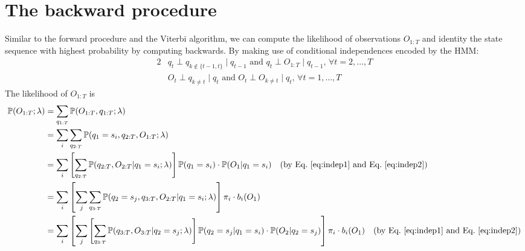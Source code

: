 \section{The backward procedure}
\label{sec:backward}

Similar to the forward procedure and the Viterbi algorithm, 
we can compute the likelihood of observations $O_{1:T}$ and identity the state sequence with highest probability by computing backwards.
By making use of conditional independences encoded by the HMM:
\begin{alignat}{2}
& q_t \perp q_{k \notin \{t-1,t\}} \mid q_{t-1} \text{~and~} q_t \perp O_{1:T} \mid q_{t-1}, \, \forall t=2,\dots,T  \label{eq:indep1} \\
& O_t \perp q_{k \ne t} \mid q_t \text{~and~} O_t \perp O_{k \ne t} \mid q_t, \, \forall t=1,\dots,T                \label{eq:indep2}
\end{alignat}
The likelihood of $O_{1:T}$ is 
\begin{align*}
\mathbb{P}(O_{1:T} ;\lambda) 
&= \sum_{q_{1:T}} \mathbb{P}(O_{1:T},q_{1:T} ;\lambda) \\
&= \sum_{i} \sum_{q_{2:T}} \mathbb{P}(q_1 = s_i, q_{2:T}, O_{1:T} ;\lambda) \\
&= \sum_{i} \left[ \sum_{q_{2:T}} \mathbb{P}(q_{2:T}, O_{2:T} |q_1 = s_i; \lambda) \right] \mathbb{P}(q_1 = s_i) \cdot \mathbb{P}(O_1 |q_1 = s_i) 
   ~~~ \text{(by Eq.~\ref{eq:indep1} and Eq.~\ref{eq:indep2})} \\
&= \sum_{i} \left[ \sum_{j} \sum_{q_{3:T}} \mathbb{P}(q_2 = s_j, q_{3:T}, O_{2:T} |q_1 = s_i; \lambda) \right] \pi_i \cdot b_i(O_1) \\
&= \sum_{i} \left[ \sum_{j} \left[ \sum_{q_{3:T}} \mathbb{P}(q_{3:T}, O_{3:T} |q_2 = s_j; \lambda) \right] \mathbb{P}(q_2 = s_j |q_1 = s_i) \cdot \mathbb{P}(O_2 |q_2 = s_j) 
   \right] \pi_i \cdot b_i(O_1) 
   ~~~ \text{(by Eq.~\ref{eq:indep1} and Eq.~\ref{eq:indep2})}
\end{align*}


